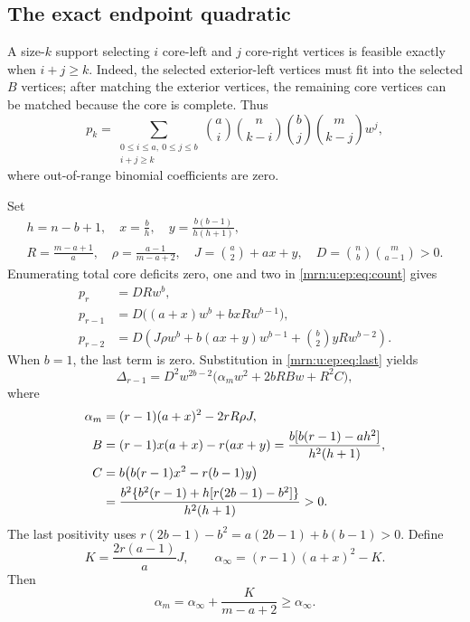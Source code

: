 \documentclass[11pt,a4paper]{article}
\theoremstyle{remark}\newtheorem{remark}[theorem]{Remark}
\begin{document}
\subsection{The exact endpoint quadratic}
A size-$k$ support selecting $i$ core-left and $j$ core-right vertices is feasible exactly when $i+j\ge k$. Indeed, the selected exterior-left vertices must fit into the selected $B$ vertices; after matching the exterior vertices, the remaining core vertices can be matched because the core is complete. Thus
\begin{equation}\label{mrn:u:ep:eq:count}
 p_k=\sum_{\substack{0\le i\le a,\ 0\le j\le b\\i+j\ge k}}
 \binom ai\binom n{k-i}\binom bj\binom m{k-j}w^j,
\end{equation}
where out-of-range binomial coefficients are zero.

Set
\begin{gather*}
 h=n-b+1,\quad x=\frac bh,\quad y=\frac{b(b-1)}{h(h+1)},\\
 R=\frac{m-a+1}{a},\quad \rho=\frac{a-1}{m-a+2},\quad
 J=\binom a2+ax+y,\quad D=\binom nb\binom m{a-1}>0.
\end{gather*}
Enumerating total core deficits zero, one and two in \eqref{mrn:u:ep:eq:count} gives
\begin{align*}
 p_r&=DRw^b,\\
 p_{r-1}&=D\big((a+x)w^b+bxRw^{b-1}\big),\\
 p_{r-2}&=D\left(J\rho w^b+b(ax+y)w^{b-1}
              +\binom b2 yRw^{b-2}\right).
\end{align*}
When $b=1$, the last term is zero. Substitution in \eqref{mrn:u:ep:eq:last} yields
\begin{equation}\label{mrn:u:ep:eq:quad}
 \Delta_{r-1}=D^2w^{2b-2}\big(\alpha_m w^2+2bRBw+R^2C\big),
\end{equation}
where
\begin{align}
 \alpha_m&=(r-1)(a+x)^2-2rR\rho J,\label{mrn:u:ep:eq:alpha}\\
 B&=(r-1)x(a+x)-r(ax+y)
   =\frac{b[b(r-1)-ah^2]}{h^2(h+1)},\label{mrn:u:ep:eq:B}\\
 C&=b\big(b(r-1)x^2-r(b-1)y\big)\notag\\
  &=\frac{b^2\{b^2(r-1)+h[r(2b-1)-b^2]\}}{h^2(h+1)}>0.\label{mrn:u:ep:eq:C}
\end{align}
The last positivity uses $r(2b-1)-b^2=a(2b-1)+b(b-1)>0$.
Define
\begin{equation}\label{mrn:u:ep:eq:limit}
 K=\frac{2r(a-1)}aJ,\qquad
 \alpha_\infty=(r-1)(a+x)^2-K.
\end{equation}
Then
\begin{equation}\label{mrn:u:ep:eq:monotone}
 \alpha_m=\alpha_\infty+\frac{K}{m-a+2}\ge\alpha_\infty.
\end{equation}
\end{document}
